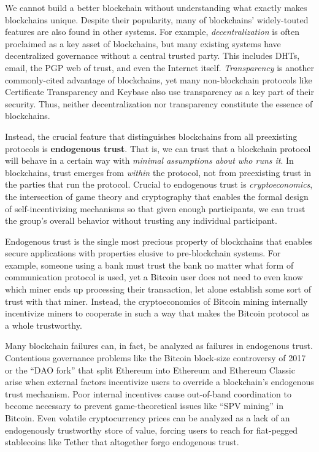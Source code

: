 \documentclass[]{article}
\begin{document}
We cannot build a better blockchain without understanding what exactly
makes blockchains unique. Despite their popularity, many of blockchains'
widely-touted features are also found in other systems. For example,
\emph{decentralization} is often proclaimed as a key asset of
blockchains, but many existing systems have decentralized governance
without a central trusted party. This includes DHTs, email, the PGP web
of trust, and even the Internet itself. \emph{Transparency} is another
commonly-cited advantage of blockchains, yet many non-blockchain
protocols like Certificate Transparency and Keybase also use
transparency as a key part of their security. Thus, neither
decentralization nor transparency constitute the essence of blockchains.

Instead, the crucial feature that distinguishes blockchains from all
preexisting protocols is \textbf{endogenous trust}. That is, we can
trust that a blockchain protocol will behave in a certain way with
\emph{minimal assumptions about who runs it}. In blockchains, trust
emerges from \emph{within} the protocol, not from preexisting trust in
the parties that run the protocol. Crucial to endogenous trust is
\emph{cryptoeconomics}, the intersection of game theory and cryptography
that enables the formal design of self-incentivizing mechanisms so that
given enough participants, we can trust the group's overall behavior
without trusting any individual participant.

Endogenous trust is the single most precious property of blockchains
that enables secure applications with properties elusive to
pre-blockchain systems. For example, someone using a bank must trust the
bank no matter what form of communication protocol is used, yet a
Bitcoin user does not need to even know which miner ends up processing
their transaction, let alone establish some sort of trust with that
miner. Instead, the cryptoeconomics of Bitcoin mining internally
incentivize miners to cooperate in such a way that makes the Bitcoin
protocol as a whole trustworthy.

Many blockchain failures can, in fact, be analyzed as failures in
endogenous trust. Contentious governance problems like the Bitcoin
block-size controversy of 2017 or the ``DAO fork'' that split Ethereum
into Ethereum and Ethereum Classic arise when external factors
incentivize users to override a blockchain's endogenous trust mechanism.
Poor internal incentives cause out-of-band coordination to become
necessary to prevent game-theoretical issues like ``SPV mining'' in
Bitcoin. Even volatile cryptocurrency prices can be analyzed as a lack
of an endogenously trustworthy store of value, forcing users to reach
for fiat-pegged stablecoins like Tether that altogether forgo endogenous
trust.
\end{document}
